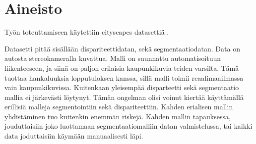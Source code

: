\chapter{Aineisto}%
\label{ch:aineisto}

Työn toteuttamiseen käytettiin cityscapes datasettiä \cite{Cordts2016Cityscapes}.


Datasetti pitää sisällään dispariteettidatan, sekä segmentaatiodatan.
Data on autosta stereokameralla kuvattua.
Malli on suunnattu automatisoituun liikenteeseen, ja siinä on paljon erilaisia kaupunkikuvia teiden varsilta.
Tämä tuottaa hankaluuksia lopputuloksen kanssa, sillä malli toimii reaalimaailmassa vain kaupunkikuvissa.
Kuitenkaan yleisempää disparteetti sekä segmentaatio mallia ei järkevästi löytynyt. 
Tämän ongelman olisi voinut kiertää käyttämällä erillisiä malleja segmentointiin sekä dispariteettiin. 
Kahden erialisen mallin yhdistäminen tuo kuitenkin enemmän riskejä.
Kahden mallin tapauksessa, jouduttaisiin joko luottamaan segmentaatiomalliin datan valmistelussa, 
tai kaikki data joduttaisiin käymään manuaalisesti läpi.
